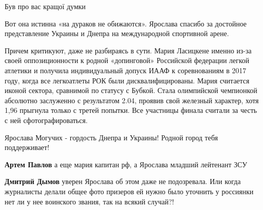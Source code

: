 \begin{itemize}
Був про вас кращої думки

 
Вот она истинна «на дураков не обижаются».
Ярослава спасибо за достойное представление Украины и Днепра на международной спортивной арене.

 

Причем критикуют, даже не разбираясь в сути. Мария Ласицкене именно из-за своей
оппозиционности к родной «допинговой» Российской федерации легкой атлетики и
получила индивидуальный допуск ИААФ к соревнованиям в 2017 году, когда все
легкоатлеты РОК были дисквалифицированы. Мария считается иконой сектора,
сравнимой по статусу с Бубкой. Стала олимпийской чемпионкой абсолютно
заслуженно с результатом 2.04, проявив свой железный характер, хотя 1,96
прыгнула только с третей попытки. Все участницы финала считали за честь с ней
сфотографироваться.

Ярослава Могучих - гордость Днепра и Украины! Родной город тебя поддерживает!

\begin{itemize}
 
\textbf{Артем Павлов} а еще мария капитан рф, а Ярослава младший лейтенант ЗСУ

 
\textbf{Дмитрий Дымов} уверен Ярослава об этом даже не подозревала. Или когда
журналисты делали общее фото призеров ей нужно было уточнить у россиянки нет ли
у нее воинского звания, так на всякий случай?!

 

\end{itemize}
\end{itemize}
